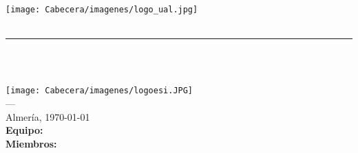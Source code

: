 \begin{titlepage}
 

\newlength{\centeroffset}
\setlength{\centeroffset}{-0.5\oddsidemargin}
\addtolength{\centeroffset}{0.5\evensidemargin}
\thispagestyle{empty}

\noindent\hspace*{\centeroffset}\begin{minipage}{\textwidth}

\centering
\texttt{[image: Cabecera/imagenes/logo\_ual.jpg]}\\[0.8cm]



{\Huge\bfseries \tipoDoc \\ }
\noindent\rule[-1ex]{\textwidth}{3pt}\\[3ex]

\textsc{ \Huge \asignatura \\[0.7cm]}

\end{minipage}

\vspace{2.3cm}
\noindent\hspace*{\centeroffset}\begin{minipage}{\textwidth}
\centering

\texttt{[image: Cabecera/imagenes/logoesi.JPG]}\\[0.1cm]

\textsc{---}\\
Almería, \today \\[1cm]

\textbf{Equipo:} {\equipo}\\[0.2cm]
\textbf{Miembros:}\\ {\primerAl\\ \segunAl \\ \tercerAl \\ \cuartoAl}\\[1cm]


\end{minipage}

\end{titlepage}


